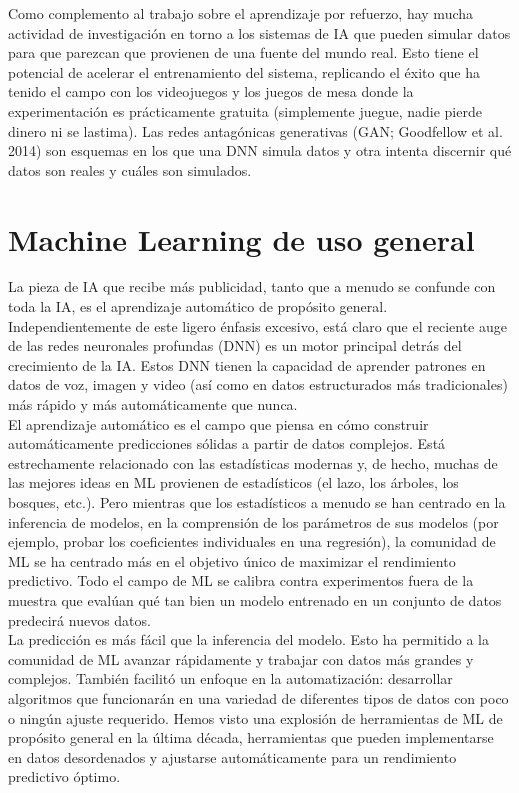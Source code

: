 Como complemento al trabajo sobre el aprendizaje por refuerzo, hay mucha actividad de investigación en torno a los sistemas de IA que pueden simular datos para que parezcan que provienen de una fuente del mundo real. Esto tiene el potencial de acelerar el entrenamiento del sistema, replicando el éxito que ha tenido el campo con los videojuegos y los juegos de mesa donde la experimentación es prácticamente gratuita (simplemente juegue, nadie pierde dinero ni se lastima). Las redes antagónicas generativas (GAN; Goodfellow et al. 2014) son esquemas en los que una DNN simula datos y otra intenta discernir qué datos son reales y cuáles son simulados.

\section{Machine Learning de uso general}
La pieza de IA que recibe más publicidad, tanto que a menudo se confunde con toda la IA, es el aprendizaje automático de propósito general. Independientemente de este ligero énfasis excesivo, está claro que el reciente auge de las redes neuronales profundas (DNN) es un motor principal detrás del crecimiento de la IA. Estos DNN tienen la capacidad de aprender patrones en datos de voz, imagen y video (así como en datos estructurados más tradicionales) más rápido y más automáticamente que nunca.\\
El aprendizaje automático es el campo que piensa en cómo construir automáticamente predicciones sólidas a partir de datos complejos. Está estrechamente relacionado con las estadísticas modernas y, de hecho, muchas de las mejores ideas en ML provienen de estadísticos (el lazo, los árboles, los bosques, etc.). Pero mientras que los estadísticos a menudo se han centrado en la inferencia de modelos, en la comprensión de los parámetros de sus modelos (por ejemplo, probar los coeficientes individuales en una regresión), la comunidad de ML se ha centrado más en el objetivo único de maximizar el rendimiento predictivo. Todo el campo de ML se calibra contra experimentos fuera de la muestra que evalúan qué tan bien un modelo entrenado en un conjunto de datos predecirá nuevos datos.\\
La predicción es más fácil que la inferencia del modelo. Esto ha permitido a la comunidad de ML avanzar rápidamente y trabajar con datos más grandes y complejos. También facilitó un enfoque en la automatización: desarrollar algoritmos que funcionarán en una variedad de diferentes tipos de datos con poco o ningún ajuste requerido. Hemos visto una explosión de herramientas de ML de propósito general en la última década, herramientas que pueden implementarse en datos desordenados y ajustarse automáticamente para un rendimiento predictivo óptimo.\\
